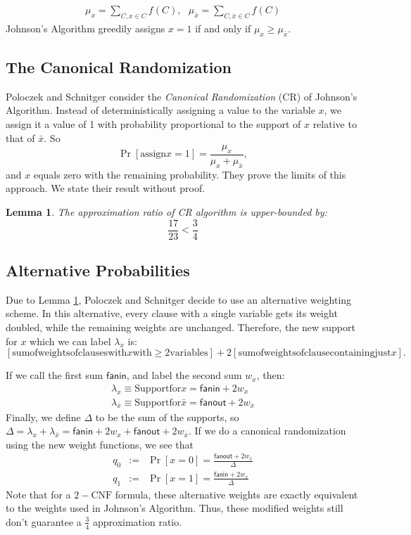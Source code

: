 \documentclass[11pt,letter]{article}
\newtheorem{lemma}{Lemma}
\begin{document}
\begin{align*}
\mu_x = \sum_{C,x\in C}f(C), \,\,\,\, \mu_{\bar{x}} =\sum_{C,\bar{x}\in C}f(C)
\end{align*}
Johnson's Algorithm greedily assigns $x=1$ if and only if $\mu_x \ge \mu_{\bar{x}}$.

\subsection{The Canonical Randomization}
Poloczek and Schnitger consider the \emph{Canonical Randomization} (CR) of Johnson's Algorithm. Instead of deterministically assigning a value to the variable $x$, we assign it a value of 1 with probability proportional to the support of $x$ relative to that of $\bar{x}$. So
\[\Pr[\mathrm{assign } x=1] = \frac{\mu_x}{\mu_x + \mu_{\bar{x}}},\] and $x$ equals zero with the remaining probability. They prove the limits of this approach. We state their result without proof. 

\begin{lemma}
\label{L:1}
The approximation ratio of CR algorithm is upper-bounded by:
$$\frac{17}{23} < \frac{3}{4}$$

\end{lemma}

\subsection{Alternative Probabilities}
Due to Lemma \ref{L:1}, Poloczek and Schnitger decide to use an alternative weighting scheme. In this alternative, every clause with a single variable gets its weight doubled, while the remaining weights are unchanged. Therefore, the new support for $x$ which we can label $\lambda_x$ is:
\[[\mathrm{sum of weights of clauses with }x\mathrm{ with }\ge 2\mathrm{ variables}] + 2[\mathrm{sum of weights of clause containing just }x].\]

If we call the first sum $\mathsf{fanin}$, and label the second sum $w_x$, then:
\begin{eqnarray*}
\lambda_x \equiv \mathrm{Support for } x = \mathsf{fanin} + 2w_x\\
\lambda_{\bar{x}} \equiv \mathrm{Support for } \bar{x} = \mathsf{fanout} + 2w_{\bar{x}}
\end{eqnarray*}
Finally, we define $\Delta$ to be the sum of the supports, so $\Delta = \lambda_{x} + \lambda_{\bar{x}} = \mathsf{fanin} + 2w_x + \mathsf{fanout} + 2w_{\bar{x}}$. If we do a canonical randomization  using the new weight functions, we see that
\begin{eqnarray*}
q_0 &:=& \Pr[x=0] = \frac{\mathsf{fanout} + 2w_{\bar{x}}}{\Delta}\\
q_1 &:=& \Pr[x=1] = \frac{\mathsf{fanin} + 2w_x}{\Delta}
\end{eqnarray*}
Note that for a $2-\text{CNF}$ formula, these alternative weights are exactly equivalent to the weights used in Johnson's Algorithm. Thus, these modified weights still don't guarantee a $\frac{3}{4}$ approximation ratio.
\end{document}
